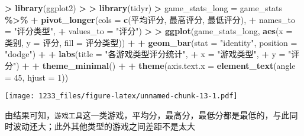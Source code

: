 \documentclass[
]{article}
\newenvironment{Shaded}{\begin{snugshade}}{\end{snugshade}}
\newcommand{\AttributeTok}[1]{\textcolor[rgb]{0.13,0.29,0.53}{#1}}
\newcommand{\DecValTok}[1]{\textcolor[rgb]{0.00,0.00,0.81}{#1}}
\newcommand{\ErrorTok}[1]{\textcolor[rgb]{0.64,0.00,0.00}{\textbf{#1}}}
\newcommand{\FunctionTok}[1]{\textcolor[rgb]{0.13,0.29,0.53}{\textbf{#1}}}
\newcommand{\NormalTok}[1]{#1}
\newcommand{\OtherTok}[1]{\textcolor[rgb]{0.56,0.35,0.01}{#1}}
\newcommand{\SpecialCharTok}[1]{\textcolor[rgb]{0.81,0.36,0.00}{\textbf{#1}}}
\newcommand{\StringTok}[1]{\textcolor[rgb]{0.31,0.60,0.02}{#1}}
\begin{document}
\begin{Shaded}
\begin{Highlighting}[]
\SpecialCharTok{\textgreater{}} \FunctionTok{library}\NormalTok{(ggplot2)}
\SpecialCharTok{\textgreater{}} 
\ErrorTok{\textgreater{}} \FunctionTok{library}\NormalTok{(tidyr)}
\SpecialCharTok{\textgreater{}}\NormalTok{ game\_stats\_long }\OtherTok{=}\NormalTok{ game\_stats }\SpecialCharTok{\%\textgreater{}\%}
\SpecialCharTok{+}   \FunctionTok{pivot\_longer}\NormalTok{(}\AttributeTok{cols =} \FunctionTok{c}\NormalTok{(平均评分, 最高评分, 最低评分),}
\SpecialCharTok{+}                \AttributeTok{names\_to =} \StringTok{"评分类型"}\NormalTok{,}
\SpecialCharTok{+}                \AttributeTok{values\_to =} \StringTok{"评分"}\NormalTok{)}
\SpecialCharTok{\textgreater{}} 
\ErrorTok{\textgreater{}} \FunctionTok{ggplot}\NormalTok{(game\_stats\_long, }\FunctionTok{aes}\NormalTok{(}\AttributeTok{x =}\NormalTok{ 类别, }\AttributeTok{y =}\NormalTok{ 评分, }\AttributeTok{fill =}\NormalTok{ 评分类型)) }\SpecialCharTok{+}
\SpecialCharTok{+}   \FunctionTok{geom\_bar}\NormalTok{(}\AttributeTok{stat =} \StringTok{"identity"}\NormalTok{, }\AttributeTok{position =} \StringTok{"dodge"}\NormalTok{) }\SpecialCharTok{+}
\SpecialCharTok{+}   \FunctionTok{labs}\NormalTok{(}\AttributeTok{title =} \StringTok{"各游戏类型评分统计"}\NormalTok{,}
\SpecialCharTok{+}        \AttributeTok{x =} \StringTok{"游戏类型"}\NormalTok{,}
\SpecialCharTok{+}        \AttributeTok{y =} \StringTok{"评分"}\NormalTok{) }\SpecialCharTok{+}
\SpecialCharTok{+}   \FunctionTok{theme\_minimal}\NormalTok{() }\SpecialCharTok{+}
\SpecialCharTok{+}   \FunctionTok{theme}\NormalTok{(}\AttributeTok{axis.text.x =} \FunctionTok{element\_text}\NormalTok{(}\AttributeTok{angle =} \DecValTok{45}\NormalTok{, }\AttributeTok{hjust =} \DecValTok{1}\NormalTok{))}
\end{Highlighting}
\end{Shaded}

\texttt{[image: 1233\_files/figure-latex/unnamed-chunk-13-1.pdf]}

由结果可知，\texttt{游戏工具}这一类游戏，平均分，最高分，最低分都是最低的，与此同时波动还大；此外其他类型的游戏之间差距不是太大
\end{document}
